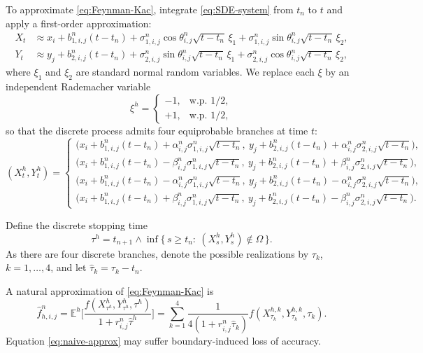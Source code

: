 \documentclass[11pt]{article}
\theoremstyle{mythm}
\theoremstyle{definition}
\begin{document}
	To approximate \eqref{eq:Feynman-Kac}, integrate \eqref{eq:SDE-system} from $t_n$ to $t$ and apply a first-order approximation:
	\begin{equation}\label{eq:process-approx}
		\begin{aligned}
			X_t &\approx x_i + b_{1,i,j}^n (t-t_n)
			+ \sigma_{1,i,j}^n \cos\theta_{i,j}^n \sqrt{t-t_n}\,\xi_1
			+ \sigma_{1,i,j}^n \sin\theta_{i,j}^n \sqrt{t-t_n}\,\xi_2,\\
			Y_t &\approx y_j + b_{2,i,j}^n (t-t_n)
			+ \sigma_{2,i,j}^n \sin\theta_{i,j}^n \sqrt{t-t_n}\,\xi_1
			+ \sigma_{2,i,j}^n \cos\theta_{i,j}^n \sqrt{t-t_n}\,\xi_2,
		\end{aligned}
	\end{equation}
	where $\xi_1$ and $\xi_2$ are standard normal random variables.  
	We replace each $\xi$ by an independent Rademacher variable
	\[
	\xi^h =
	\begin{cases}
		-1,& \text{w.p. } 1/2,\\[1pt]
		+1,& \text{w.p. } 1/2,
	\end{cases}
	\]
	so that the discrete process admits four equiprobable branches at time $t$:
	\[
	(X_t^h,Y_t^h) =
	\begin{cases}
		\big(x_i + b_{1,i,j}^n (t-t_n) + \alpha_{i,j}^n\sigma_{1,i,j}^n \sqrt{t-t_n},\ 
		y_j + b_{2,i,j}^n (t-t_n) + \alpha_{i,j}^n\sigma_{2,i,j}^n \sqrt{t-t_n}\big),\\[1pt]
		\big(x_i + b_{1,i,j}^n (t-t_n) - \beta_{i,j}^n\sigma_{1,i,j}^n \sqrt{t-t_n},\ 
		y_j + b_{2,i,j}^n (t-t_n) + \beta_{i,j}^n\sigma_{2,i,j}^n \sqrt{t-t_n}\big),\\[1pt]
		\big(x_i + b_{1,i,j}^n (t-t_n) - \alpha_{i,j}^n\sigma_{1,i,j}^n \sqrt{t-t_n},\ 
		y_j + b_{2,i,j}^n (t-t_n) - \alpha_{i,j}^n\sigma_{2,i,j}^n \sqrt{t-t_n}\big),\\[1pt]
		\big(x_i + b_{1,i,j}^n (t-t_n) + \beta_{i,j}^n\sigma_{1,i,j}^n \sqrt{t-t_n},\ 
		y_j + b_{2,i,j}^n (t-t_n) - \beta_{i,j}^n\sigma_{2,i,j}^n \sqrt{t-t_n}\big).
	\end{cases}
	\]
	
	Define the discrete stopping time
	\[
	\tau^h = t_{n+1} \wedge \inf\{\,s\ge t_n:\ (X_s^h,Y_s^h)\notin\Omega\,\}.
	\]
	As there are four discrete branches, denote the possible realizations by $\tau_k$, $k=1,\dots,4$, and let $\hat{\tau}_k = \tau_k - t_n$.
	
	A natural approximation of \eqref{eq:Feynman-Kac} is
	\begin{equation}\label{eq:naive-approx}
		\hat f_{h,i,j}^n
		= \mathbb{E}^h \Bigg[\frac{f(X_{\tau^h}^{h}, Y_{\tau^h}^{h}, \tau^h)}{1 + r_{i,j}^n \hat\tau^h}\Bigg]
		= \sum_{k=1}^4 \frac{1}{4 (1 + r_{i,j}^n \hat\tau_k)} 
		f(X_{\tau_k}^{h,k}, Y_{\tau_k}^{h,k}, \tau_k).
	\end{equation}
	Equation \eqref{eq:naive-approx} may suffer boundary-induced loss of accuracy.
	
\end{document}
